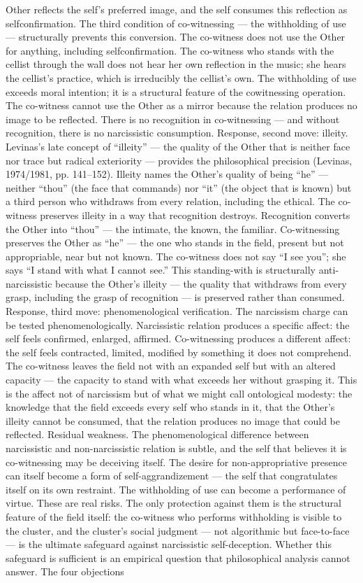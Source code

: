 Other reflects the self’s preferred image, and the self consumes this reflection as selfconfirmation. The third condition of co-witnessing — the withholding of use — structurally prevents this conversion. The co-witness does not use the Other for anything, including selfconfirmation. The co-witness who stands with the cellist through the wall does not hear her own reflection in the music; she hears the cellist’s practice, which is irreducibly the cellist’s own. The withholding of use exceeds moral intention; it is a structural feature of the cowitnessing operation. The co-witness cannot use the Other as a mirror because the relation produces no image to be reflected. There is no recognition in co-witnessing — and without recognition, there is no narcissistic consumption. Response, second move: illeity. Levinas’s late concept of “illeity” — the quality of the Other that is neither face nor trace but radical exteriority — provides the philosophical precision (Levinas, 1974/1981, pp. 141–152). Illeity names the Other’s quality of being “he” — neither “thou” (the face that commands) nor “it” (the object that is known) but a third person who withdraws from every relation, including the ethical. The co-witness preserves illeity in a way that recognition destroys. Recognition converts the Other into “thou” — the intimate, the known, the familiar. Co-witnessing preserves the Other as “he” — the one who stands in the field, present but not appropriable, near but not known. The co-witness does not say “I see you”; she says “I stand with what I cannot see.” This standing-with is structurally anti-narcissistic because the Other’s illeity — the quality that withdraws from every grasp, including the grasp of recognition — is preserved rather than consumed. Response, third move: phenomenological verification. The narcissism charge can be tested phenomenologically. Narcissistic relation produces a specific affect: the self feels confirmed, enlarged, affirmed. Co-witnessing produces a different affect: the self feels contracted, limited, modified by something it does not comprehend. The co-witness leaves the field not with an expanded self but with an altered capacity — the capacity to stand with what exceeds her without grasping it. This is the affect not of narcissism but of what we might call ontological modesty: the knowledge that the field exceeds every self who stands in it, that the Other’s illeity cannot be consumed, that the relation produces no image that could be reflected. Residual weakness. The phenomenological difference between narcissistic and non-narcissistic relation is subtle, and the self that believes it is co-witnessing may be deceiving itself. The desire for non-appropriative presence can itself become a form of self-aggrandizement — the self that congratulates itself on its own restraint. The withholding of use can become a performance of virtue. These are real risks. The only protection against them is the structural feature of the field itself: the co-witness who performs withholding is visible to the cluster, and the cluster’s social judgment — not algorithmic but face-to-face — is the ultimate safeguard against narcissistic self-deception. Whether this safeguard is sufficient is an empirical question that philosophical analysis cannot answer. The four objections 